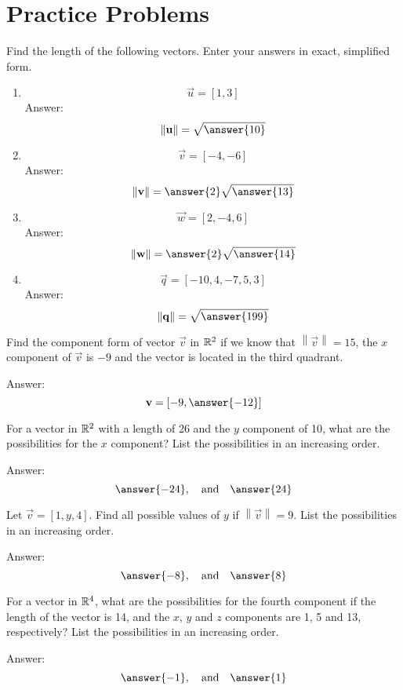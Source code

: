 \documentclass{ximera}
\newcommand\norm[1]{\left\lVert#1\right\rVert}
\begin{document}
\section*{Practice Problems}
\begin{problem}
Find the length of the following vectors.  Enter your answers in exact, simplified form.
\begin{enumerate}
\item
 $$\vec{u}=[1,3]$$ 
 Answer:
 $$\norm{\vec{u}}=\sqrt{\answer{10}}$$
 \item
 $$\vec{v}=[-4,-6]$$
 Answer:
 $$\norm{\vec{v}}=\answer{2}\sqrt{\answer{13}}$$
 \item
 $$\vec{w}=[2,-4,6]$$
 Answer:
 $$\norm{\vec{w}}=\answer{2}\sqrt{\answer{14}}$$
 \item
 $$\vec{q}=[-10, 4, -7, 5, 3]$$
 Answer:
 $$\norm{\vec{q}}=\sqrt{\answer{199}}$$
 \end{enumerate}
 \end{problem}
 
\begin{problem}
Find the component form of vector $\vec{v}$ in $\mathbb{R}^2$ if we know that $\norm{\vec{v}}=15$, the $x$ component of $\vec{v}$ is $-9$ and the vector is located in the third quadrant.

Answer:
$$\vec{v}=[-9,\answer{-12}]$$
\end{problem}

\begin{problem}
For a vector in $\mathbb{R}^2$ with a length of 26 and the $y$ component of 10, what are the possibilities for the $x$ component?  List the possibilities in an increasing order.

Answer:
$$\answer{-24},\quad\text{and}\quad\answer{24} $$
\end{problem}

\begin{problem}
Let $\vec{v}=[1, y, 4]$.  Find all possible values of $y$ if $\norm{\vec{v}}=9$.  List the possibilities in an increasing order.

Answer:
$$\answer{-8},\quad\text{and}\quad\answer{8}$$
\end{problem}

\begin{problem}
For a vector in $\mathbb{R}^4$, what are the possibilities for the fourth component if the length of the vector is 14, and the $x$, $y$ and $z$ components are 1, 5 and 13, respectively? List the possibilities in an increasing order.

Answer:
$$\answer{-1},\quad\text{and}\quad\answer{1}$$
\end{problem}
 
 
\end{document}
